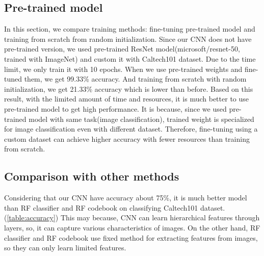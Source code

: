 \subsection{Pre-trained model}
In this section, we compare training methods: fine-tuning pre-trained model and training from scratch from random initialization. Since our CNN does not have pre-trained version, we used pre-trained ResNet model(microsoft/resnet-50, trained with ImageNet) and custom it with Caltech101 dataset. Due to the time limit, we only train it with 10 epochs. When we use pre-trained weights and fine-tuned them, we get 99.33\% accuracy. And training from scratch with random initialization, we get 21.33\% accuracy which is lower than before. Based on this result, with the limited amount of time and resources, it is much better to use pre-trained model to get high performance. It is because, since we used pre-trained model with same task(image classification), trained weight is specialized for image classification even with different dataset. Therefore, fine-tuning using a custom dataset can achieve higher accuracy with fewer resources than training from scratch.

\subsection{Comparison with other methods}
Considering that our CNN have accuracy about 75\%, it is much better model than RF classifier and RF codebook on classifying Caltech101 dataset. (\cref{table:accuracy}) This may because, CNN can learn hierarchical features through layers, so, it can capture various characteristics of images. On the other hand, RF classifier and RF codebook use fixed method for extracting features from images, so they can only learn limited features.

\begin{table}[htbp]
	\centering
	\setlength{\tabcolsep}{6pt} %
	\renewcommand{\arraystretch}{1.5} %
	\caption{Accuracy of Models}
	\label{table:accuracy}
\end{table}